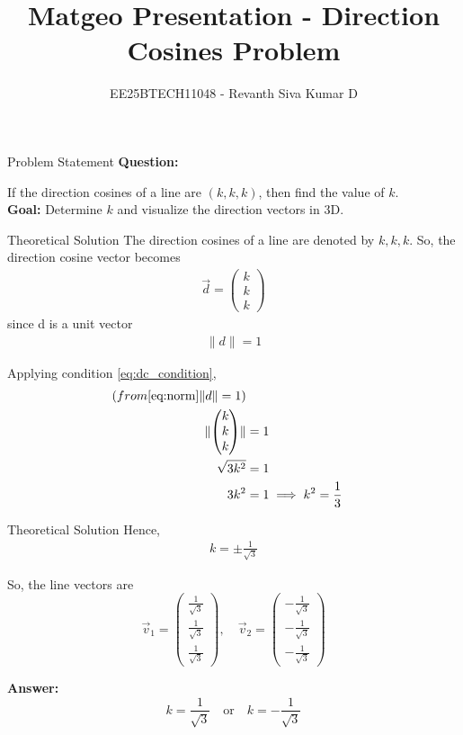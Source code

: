 \documentclass{beamer}
\title{Matgeo Presentation - Direction Cosines Problem}
\author{EE25BTECH11048 - Revanth Siva Kumar D}
\numberwithin{equation}{section}
\providecommand{\brak}[1]{\ensuremath{\left(#1\right)}}
\providecommand{\myvec}[1]{\ensuremath{\begin{pmatrix}#1\end{pmatrix}}}
\providecommand{\norm}[1]{\lVert#1\rVert}
\begin{document}
\begin{frame}
  \titlepage
\end{frame}

\begin{frame}{Problem Statement}
\textbf{Question:}  

If the direction cosines of a line are $\brak{k,k,k}$, then find the value of $k$.\\

\textbf{Goal:} Determine $k$ and visualize the direction vectors in 3D.
\end{frame}

\begin{frame}{Theoretical Solution}
The direction cosines of a line are denoted by $k, k, k$.  
So, the direction cosine vector becomes
\begin{align}
\vec{d} = \myvec{k \\ k \\ k}
\label{eq:dc_condition}
\end{align}
since d is a unit vector \begin{align}
    \norm{d}=1
    \label{eq:norm}
\end{align}

Applying condition \eqref{eq:dc_condition},
\begin{align}
(from \eqref{eq:norm} \norm{d}=1)\\
\norm{\myvec{k\\k\\k}} &= 1\\
\sqrt{3k^2} &= 1 \\ 
3k^2 &= 1 \implies k^2=\frac{1}{3}
\end{align}
\end{frame}
\begin{frame}{Theoretical Solution}
Hence,
\begin{align}
k = \pm \frac{1}{\sqrt{3}}
\end{align}

So, the line vectors are
\[
\vec{v}_1 = \myvec{\frac{1}{\sqrt{3}} \\ \frac{1}{\sqrt{3}} \\ \frac{1}{\sqrt{3}}}, 
\quad
\vec{v}_2 = \myvec{-\frac{1}{\sqrt{3}} \\ -\frac{1}{\sqrt{3}} \\ -\frac{1}{\sqrt{3}}}
\]

\textbf{Answer:} 
\[
k = \frac{1}{\sqrt{3}} \quad \text{or} \quad k = -\frac{1}{\sqrt{3}}
\]
\end{frame}
\end{document}
